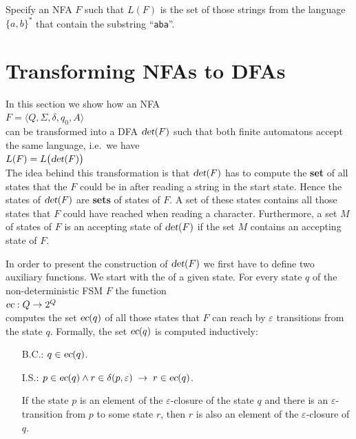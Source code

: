 \exerciseEng
Specify an \textsc{NFA} $F$ such that $L(F)$ is the set of those
strings from the language  $\{a,b\}^*$ that contain the substring ``\texttt{aba}''. \eox

\section{Transforming NFAs to DFAs}
In this section we show how an \textsc{NFA} 
\\[0.2cm]
\hspace*{1.3cm}
$F = \langle Q, \Sigma, \delta, q_0, A \rangle$ 
\\[0.2cm]
can be transformed into a \textsc{DFA} $\textsl{det}(F)$ such that both finite automatons accept the
same language, i.e.~we have
\\[0.2cm]
\hspace*{1.3cm}
$L(F) = L\bigl(\textsl{det}(F)\bigr)$
\\[0.2cm]
The idea behind this transformation is that $\textsl{det}(F)$ has to compute the \textbf{set} of all states that the
$F$ could be in after reading a string in the start state.   Hence the states of 
$\textsl{det}(F)$ are  \textbf{sets} of states of $F$.  A set
of these states contains all those  
states that $F$ could have reached when reading a character.
Furthermore, a set $M$ of states of $F$ is an accepting state of 
$\textsl{det}(F)$ if the set $M$ contains an accepting state of $F$.

In order to present the construction of $\textsl{det}(F)$ we first have to define two auxiliary functions.
We start with the   of a given state.  For every state
$q$ of the non-deterministic \textsc{FSM} $F$ the function
\\[0.2cm]
\hspace*{1.3cm}
$\textsl{ec}: Q \rightarrow 2^Q$
\\[0.2cm]
computes the set $\textsl{ec}(q)$ of all those states that $F$ can reach by $\varepsilon$
transitions from the state $q$.   Formally, the set $\textsl{ec}(q)$ is computed inductively:
\begin{enumerate}
\item[B.C.:] $q \in \textsl{ec}(q)$.
\item[I.S.:] $p \in \textsl{ec}(q) \wedge r \in \delta(p, \varepsilon) \;\rightarrow\; r \in \textsl{ec}(q)$.
 
             If the state $p$ is an element of the $\varepsilon$-closure of the state $q$ and there is an
             $\varepsilon$-transition from $p$ to some state $r$, then $r$ is also an element
             of the $\varepsilon$-closure of $q$. 
\end{enumerate}


